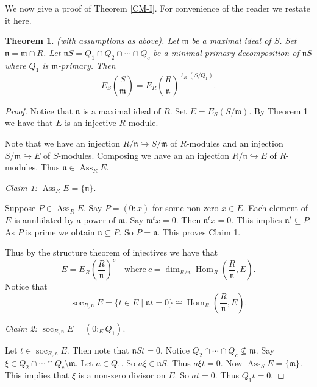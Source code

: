 \documentclass{amsart}
\theoremstyle{plain}
\newtheorem{theorem}{Theorem}[section]
\theoremstyle{definition}
\theoremstyle{remark}
\numberwithin{equation}{theorem}
\begin{document}
We now give a proof of Theorem \ref{CM-I}. For convenience of the reader we restate it here. 
\begin{theorem}\label{CM}
(with assumptions as above). Let ${\mathfrak{m} }$ be a maximal ideal of $S$. Set ${\mathfrak{n} } = {\mathfrak{m} } \cap R$.
Let ${\mathfrak{n} } S = Q_1\cap Q_2\cap\cdots \cap Q_c$ be a minimal primary decomposition of ${\mathfrak{n} } S$ where $Q_1$ is ${\mathfrak{m} }$-primary.
Then
\[
E_S\left(\frac{S}{\mathfrak{m} }\right) = E_R\left(\frac{R}{\mathfrak{n} }\right)^{\ell_R(S/Q_1)}.
\]
\end{theorem}
\begin{proof}
Notice that ${\mathfrak{n} }$ is a maximal ideal of $R$. Set $E = E_S(S/{\mathfrak{m} })$. By Theorem 1 we have that $E$ is an injective $R$-module.

 Note that we have an injection $R/{\mathfrak{n} } \hookrightarrow S/{\mathfrak{m} } $ of $R$-modules and an injection $S/{\mathfrak{m} } \hookrightarrow E$ of $S$-modules. Composing we have an
an injection $R/{\mathfrak{n} } \hookrightarrow E$ of $R$-modules. Thus ${\mathfrak{n} } \in {\operatorname{Ass}}_R E$.

\emph{Claim 1:} ${\operatorname{Ass}}_R E = \{ {\mathfrak{n} } \}.$

Suppose $P \in {\operatorname{Ass}}_R E$. Say $P = (0 \colon x)$ for some non-zero $x \in E$. Each element of $E$ is annhilated by a power of ${\mathfrak{m} }$.
Say ${\mathfrak{m} }^t x = 0$. Then ${\mathfrak{n} }^t x = 0$. This implies ${\mathfrak{n} }^t \subseteq P$. As $P$ is prime we obtain ${\mathfrak{n} } \subseteq P$. So $P = {\mathfrak{n} }$. This proves Claim 1.

Thus by the structure theorem of injectives \cite[3.2.8]{BH} we have that
\[
E = E_R\left(\frac{R}{\mathfrak{n} }\right)^{c} \quad \text{where} \ c = \dim_{R/{\mathfrak{n} }} {\operatorname{Hom}}_R\left(\frac{R}{\mathfrak{n} }, E \right).
\]
Notice that
\[
{\operatorname{soc}}_{R,{\mathfrak{n} }} E = \{ t \in E \mid {\mathfrak{n} } t = 0 \} \cong {\operatorname{Hom}}_R\left(\frac{R}{\mathfrak{n} }, E\right).
\]

\emph{Claim 2:} ${\operatorname{soc}}_{R,{\mathfrak{n} }} E = (0 \colon_E Q_1)$.

Let $t \in {\operatorname{soc}}_{R,{\mathfrak{n} }} E$. Then note that ${\mathfrak{n} } S t = 0$. Notice $Q_2\cap \cdots \cap Q_c \nsubseteq {\mathfrak{m} }$. Say $\xi \in Q_2\cap \cdots \cap Q_c \setminus {\mathfrak{m} }$. Let $a \in Q_1.$ So $a\xi \in {\mathfrak{n} } S$. Thus $a\xi t = 0$. Now ${\operatorname{Ass}}_S E = \{ {\mathfrak{m} }\}$. This implies that $\xi$ is a non-zero divisor on $E$. So
$at = 0$. Thus $Q_1 t = 0$.


\end{proof}
\end{document}
